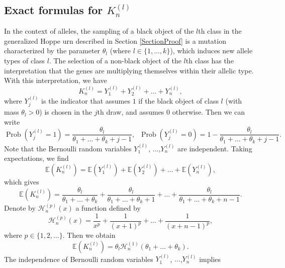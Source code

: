 \documentclass[12pt]{amsart}
\theoremstyle{definition}
\numberwithin{equation}{section}
\DeclareMathOperator{\Prob}{Prob}
\begin{document}
\subsection{Exact formulas for $K_n^{(l)}$}\label{SectionExactFormulasK}
In the context of alleles, the sampling of a black object of the $l$th class in the generalized Hoppe urn described in Section
\ref{SectionProof}
is a mutation characterized by the parameter $\theta_l$ (where $l\in\{1,\ldots,k\}$), which induces new allele types of class $l$. The selection of a non-black object of the $l$th class has the interpretation that the genes are multiplying themselves within their allelic type. With this interpretation,
we have
\begin{equation}\label{K3.1}
K_n^{(l)}=Y_1^{(l)}+Y_2^{(l)}+\ldots+Y_n^{(l)},
\end{equation}
where $Y_j^{(l)}$ is the indicator that assumes $1$ if the black object of class $l$  (with mass $\theta_l>0$) is chosen in the $j$th draw, and assumes $0$ otherwise. Then we can write
\begin{equation}\label{K3.2}
\Prob\left(Y_j^{(l)}=1\right)=\frac{\theta_l}{\theta_1+\ldots+\theta_k+j-1},
\;\;\Prob\left(Y_j^{(l)}=0\right)=1-\frac{\theta_l}{\theta_1+\ldots+\theta_k+j-1}.
\end{equation}
Note that the Bernoulli random variables $Y_1^{(l)}$, $\ldots$,$Y_n^{(l)}$ are independent. Taking expectations, we find
\begin{equation}
\mathbb{E}\left(K_n^{(l)}\right)
=\mathbb{E}(Y_1^{(l)})+\mathbb{E}(Y_2^{(l)})+\ldots+\mathbb{E}(Y_n^{(l)}),
\end{equation}
which gives
\begin{equation}\label{ExpectationNumberAlleles}
\mathbb{E}\left(K_n^{(l)}\right)=\frac{\theta_l}{\theta_1+\ldots+\theta_k}
+\frac{\theta_l}{\theta_1+\ldots+\theta_k+1}+\ldots+
\frac{\theta_l}{\theta_1+\ldots+\theta_k+n-1}.
\end{equation}
Denote by $\mathcal{H}_n^{(p)}(x)$  a function defined by
\begin{equation}\label{H3.5}
\mathcal{H}_n^{(p)}(x)=\frac{1}{x^p}+\frac{1}{(x+1)^p}+\ldots+\frac{1}{(x+n-1)^p},
\end{equation}
where $p\in \{1,2,\ldots\}$. Then we obtain
\begin{equation}\label{3.6}
\mathbb{E}\left(K_n^{(l)}\right)=\theta_l\mathcal{H}_n^{(1)}\left(\theta_1+\ldots+\theta_k\right).
\end{equation}
The independence of Bernoulli random variables $Y_1^{(l)}$, $\ldots$,$Y_n^{(l)}$ implies
\end{document}
